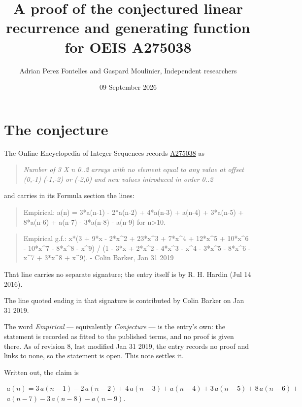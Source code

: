 \documentclass[11pt]{article}
\title{A proof of the conjectured linear recurrence and generating function for OEIS A275038}
\author{Adrian Perez Fontelles and Gaspard Moulinier, Independent researchers}
\date{09 September 2026}
\theoremstyle{definition}
\begin{document}
\maketitle
\section{The conjecture}

The Online Encyclopedia of Integer Sequences records \href{https://oeis.org/A275038}{A275038} as

\begin{quote}\itshape Number of 3 X n 0..2 arrays with no element equal to any value at offset (0,-1) (-1,-2) or (-2,0) and new values introduced in order 0..2\end{quote}

and carries in its Formula section the lines:

\begin{quote}\ttfamily Empirical: a(n) = 3*a(n-1) - 2*a(n-2) + 4*a(n-3) + a(n-4) + 3*a(n-5) + 8*a(n-6) + a(n-7) - 3*a(n-8) - a(n-9) for n>10.\end{quote}

\begin{quote}\ttfamily Empirical g.f.: x*(3 + 9*x - 2*x\textasciicircum{}2 + 23*x\textasciicircum{}3 + 7*x\textasciicircum{}4 + 12*x\textasciicircum{}5 + 10*x\textasciicircum{}6 - 10*x\textasciicircum{}7 - 8*x\textasciicircum{}8 - x\textasciicircum{}9) / (1 - 3*x + 2*x\textasciicircum{}2 - 4*x\textasciicircum{}3 - x\textasciicircum{}4 - 3*x\textasciicircum{}5 - 8*x\textasciicircum{}6 - x\textasciicircum{}7 + 3*x\textasciicircum{}8 + x\textasciicircum{}9). - Colin Barker, Jan 31 2019\end{quote}

That line carries no separate signature; the entry itself is by R. H. Hardin (Jul 14 2016).

The line quoted ending in that signature is contributed by Colin Barker on Jan 31 2019.

The word {\itshape Empirical} --- equivalently {\itshape Conjecture} --- is the entry's own: the statement is recorded as fitted to the published terms, and no proof is given there. As of revision 8, last modified Jan 31 2019, the entry records no proof and links to none, so the statement is open. This note settles it.

Written out, the claim is

\begin{multline*} a(n) = 3\,a(n-1) - 2\,a(n-2) + 4\,a(n-3) + a(n-4) + 3\,a(n-5) + 8\,a(n-6) + \\ a(n-7) - 3\,a(n-8) - a(n-9). \end{multline*}
\end{document}
